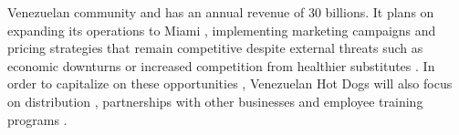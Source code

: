  Venezuelan community and has an annual revenue of 30 billions. It plans on expanding its operations to Miami , implementing marketing campaigns and pricing strategies that remain competitive despite external threats such as economic downturns or increased competition from healthier substitutes . In order to capitalize on these opportunities , Venezuelan Hot Dogs will also focus on distribution , partnerships with other businesses and employee training programs . 